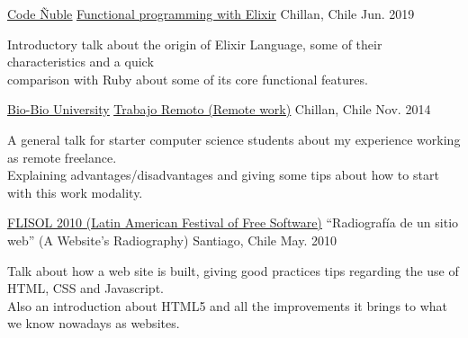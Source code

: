 

\begin{cventries}

  \cventry
    {\href{https://codenuble.cl/}{\underline{Code Ñuble}}} %
    {\href{https://alagos.github.io/elixir-talk}{\underline{Functional programming with Elixir}}} %
    {Chillan, Chile} %
    {Jun. 2019} %
    {
      \begin{cvitems} %
        \item { Introductory talk about the origin of Elixir Language, some of
          their characteristics and a quick \\
          comparison with Ruby about some of its core functional features.
        }
      \end{cvitems}
    }

  \cventry
    {\href{http://www.ubiobio.cl/}{\underline{Bio-Bio University}}} %
    {\href{https://alagos.github.io/trabajo-remoto}{\underline{Trabajo Remoto (Remote work)}}} %
    {Chillan, Chile} %
    {Nov. 2014} %
    {
      \begin{cvitems} %
        \item { A general talk for starter computer science students about my
          experience working as remote freelance.\\
          Explaining advantages/disadvantages and giving some tips about how to start with this work modality.
        }
      \end{cvitems}
    }

  \cventry
    {\href{http://santiago.flisol.cl/}{\underline{FLISOL 2010 (Latin American Festival of Free Software)}}} %
    {“Radiografía de un sitio web” (A Website's Radiography)} %
    {Santiago, Chile} %
    {May. 2010} %
    {
      \begin{cvitems} %
        \item { Talk about how a web site is built, giving good practices tips
          regarding the use of HTML, CSS and Javascript.\\
          Also an introduction about HTML5 and all the improvements it brings to what we know nowadays as websites.
        }
      \end{cvitems}
    }

\end{cventries}
